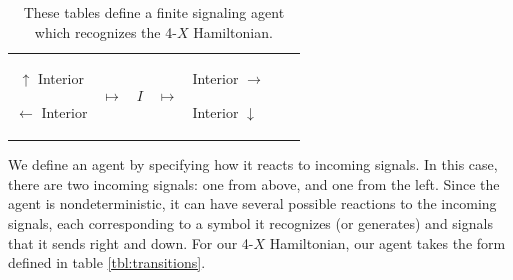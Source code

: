 \documentclass[12pt]{amsbook}
\theoremstyle{plain}
\theoremstyle{definition}
\theoremstyle{remark}
\begin{document}
\begin{table}
{\begin{tabular*}{\columnwidth}{cllclll}
{\begin{trivlist}
\item[$\uparrow$] Interior
\item[$\leftarrow$] Interior
\end{trivlist}}
 & $\longmapsto$ & $I$ & $\longmapsto$ &
\parbox{1.25in}{\noindent
\begin{trivlist}
\item[] Interior $\rightarrow$
\item[] Interior $\downarrow$
\end{trivlist}} \\
\bottomrule
\end{tabular*}
}

\caption{These tables define a finite signaling agent which recognizes the 4-$X$ Hamiltonian.}

\end{table}

We define an agent by specifying how it reacts to incoming signals.  In this case, there are two incoming signals:  one from above, and one from the left.  Since the agent is nondeterministic, it can have several possible reactions to the incoming signals, each corresponding to a symbol it recognizes (or generates) and signals that it sends right and down.  For our 4-$X$ Hamiltonian, our agent takes the form defined in table \ref{tbl:transitions}.
\end{document}
